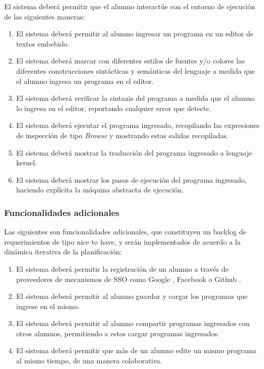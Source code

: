 \documentclass[a4paper,11pt]{article}
\begin{document}
El sistema deberá permitir que el alumno interactúe con el entorno de ejecución
de las siguientes maneras:

\begin{enumerate}

  \item El sistema deberá permitir al alumno ingresar un programa en un
    editor de textos embebido.

  \item El sistema deberá marcar con diferentes estilos de fuentes y/o
    colores las diferentes construcciones sintácticas y semánticas del
      lenguaje a medida que el alumno ingresa un programa en el editor.

    \item El sistema deberá verificar la sintaxis del programa a medida que el
      alumno lo ingresa en el editor, reportando cualquier error que detecte.

    \item El sistema deberá ejecutar el programa ingresado, recopilando las
      expresiones de inspección de tipo \textit{Browse} y mostrando estas
      salidas recopiladas.

    \item El sistema deberá mostrar la traducción del programa ingresado a
      lenguaje kernel.

    \item El sistema deberá mostrar los pasos de ejecución del programa
      ingresado, haciendo explícita la máquina abstracta de ejecución.

\end{enumerate}

\subsubsection{Funcionalidades adicionales}

Las siguientes son funcionalidades adicionales, que constituyen un backlog de
requerimientos de tipo nice to have, y serán implementados de acuerdo a la
dinámica iterativa de la planificación:

\begin{enumerate}

  \item El sistema deberá permitir la registración de un alumno a través de
    proveedores de mecanismos de SSO como Google \cite{googleoauth}, Facebook
    \cite{facebookoauth} o Github \cite{githuboauth}.

  \item El sistema deberá permitir al alumno guardar y cargar los programas
    que ingrese en el mismo.

  \item El sistema deberá permitir al alumno compartir programas ingresados
    con otros alumnos, permitiendo a estos cargar programas ingresados.

  \item El sistema deberá permitir que más de un alumno edite un mismo
    programa al mismo tiempo, de una manera colaborativa.

\end{enumerate}
\end{document}
